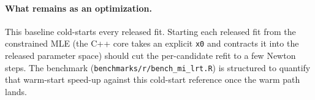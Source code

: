 \documentclass[11pt]{article}
\theoremstyle{plain}
\theoremstyle{remark}
\begin{document}
\paragraph{What remains as an optimization.} This baseline cold-starts every
released fit. Starting each released fit from the constrained MLE (the C++ core
takes an explicit \texttt{x0} and contracts it into the released parameter space)
should cut the per-candidate refit to a few Newton steps. The benchmark
(\texttt{benchmarks/r/bench\_mi\_lrt.R}) is structured to quantify that warm-start
speed-up against this cold-start reference once the warm path lands.
\end{document}
